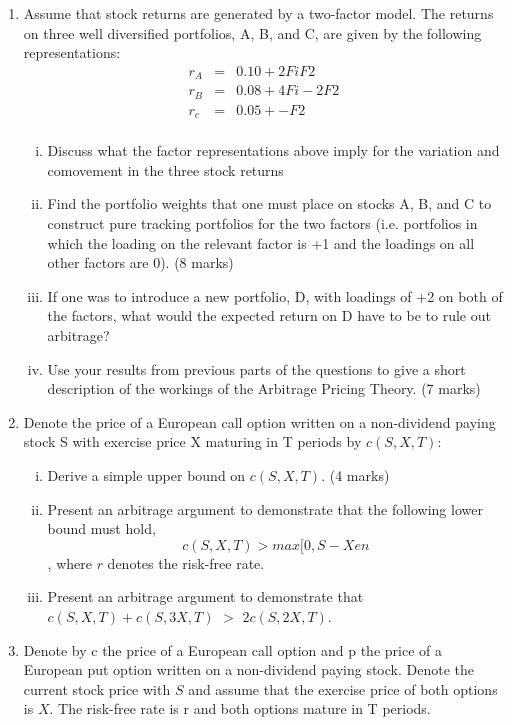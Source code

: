 \documentclass[a4paper,12pt]{article}
\begin{document}
\begin{enumerate}
\item Assume that stock returns are generated by a two-factor model. The returns on three well diversified portfolios, A, B, and C, are given by the following representations: 
\begin{eqnarray*}
r_A &=& 0.10 + 2Fi F2 \\
r_B &=& 0.08 + 4Fi - 2F2 \\
r_c &=& 0.05 + - F2 \\
\end{eqnarray*}
\begin{enumerate}[(i)]
    \item Discuss what the factor representations above imply for the variation and comovement in the three stock returns  
\item Find the portfolio weights that one must place on stocks A, B, and C to construct pure tracking portfolios for the two factors (i.e. portfolios in which the loading on the relevant factor is +1 and the loadings on all other factors are 0). (8 marks) 
\item  If one was to introduce a new portfolio, D, with loadings of +2 on both of the factors, what would the expected return on D have to be to rule out arbitrage?  
\item  Use your results from previous parts of the questions to give a short description of the workings of the Arbitrage Pricing Theory. (7 marks) 
\end{enumerate}
\item Denote the price of a European call option written on a non-dividend paying stock S with exercise price X maturing in T periods by $c(S,X,T)$: 
\begin{enumerate}[(i)]
    \item  Derive a simple upper bound on $c(S,X,T)$. (4 marks) 
\item  Present an arbitrage argument to demonstrate that the following lower bound must hold, $$c(S,X,T)>max [0, S-Xen$$, where $r$ denotes the risk-free rate. 
\item  Present an arbitrage argument to demonstrate that $c(S,X,T) + c(S,3X,T)$ $>$ $2 c(S, 2X,T)$. 
\end{enumerate}
\item Denote by c the price of a European call option and p the price of a European put option written on a non-dividend paying stock. Denote the current stock price with $S$ and assume that the exercise price of both options is $X$. The risk-free rate is r and both options mature in T periods. 
\begin{enumerate}[(i)]

\end{enumerate}
\end{enumerate}
\end{document}
